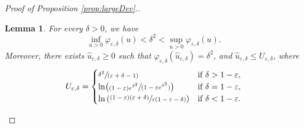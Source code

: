 \documentclass[10pt]{amsart}
\newcommand{\spfrac}[2]{\sfrac{#1}{(#2)}}
\newtheorem{lemma}{Lemma}
\theoremstyle{definition}
\begin{document}
\begin{proof}[Proof of Proposition \ref{prop:largeDev}.]
\begin{lemma}\label{lem:estim1214}
For every $\delta>0$, we have
\[
\inf_{u >0}\varphi_{\varepsilon,\delta}(u)< \delta^2< \sup_{u >0}\varphi_{\varepsilon,\delta}(u).
\]
Moreover, there exists $\hat u_{\varepsilon,\delta}\geq 0$ such that $\varphi_{\varepsilon,\delta}(\hat u_{\varepsilon,\delta})=\delta^2$, and $\hat u_{\varepsilon,\delta}\leq U_{\varepsilon,\delta}$, where
\[
U_{\varepsilon,\delta}=\begin{cases}
\spfrac{\delta^2}{\varepsilon+\delta-1} & \text{if }\delta>1-\varepsilon,\\
\ln\bigl(\spfrac{(1-\varepsilon)e^{\delta^2}}{1-\varepsilon e^{\delta^2}} \bigr)& \text{if }\delta=1-\varepsilon,\\
\ln\left(\sfrac{(1-\varepsilon)(\varepsilon+\delta)}{\varepsilon(1-\varepsilon -\delta)}\right) & \text{if }\delta<1-\varepsilon.
\end{cases}
\]
\end{lemma}


\end{proof}
\end{document}
